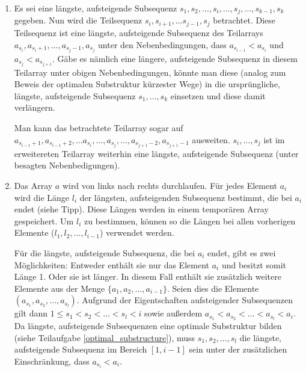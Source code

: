\documentclass[11pt,a4paper]{article}
\begin{document}
\begin{loesung}
    \begin{enumerate}
        \item Es sei eine längste, aufsteigende Subsequenz $s_1, s_2, \ldots, s_i, \ldots, s_j, \ldots, s_{k - 1}, s_k$ gegeben.
        Nun wird die Teilsequenz $s_i, s_{i + 1}, \ldots s_{j - 1}, s_j$ betrachtet.
        Diese Teilsequenz ist eine längste, aufsteigende Subsequenz des Teilarrays $a_{s_i}, a_{s_i + 1}, \ldots, a_{s_j - 1}, a_{s_j}$ unter den Nebenbedingungen, dass $a_{s_{i - 1}} < a_{s_i}$ und $a_{s_j} < a_{s_{j + 1}}$.
        Gäbe es nämlich eine längere, aufsteigende Subsequenz in diesem Teilarray unter obigen Nebenbedingungen, könnte man diese (analog zum Beweis der optimalen Substruktur kürzester Wege) in die ursprüngliche, längste, aufsteigende Subsequenz $s_1, \ldots, s_k$ einsetzen und diese damit verlängern.

        Man kann das betrachtete Teilarray sogar auf $a_{s_{i - 1} + 1}, a_{s_{i - 1} + 2}, \ldots a_{s_i}, \ldots, a_{s_j}, \ldots, a_{s_{j + 1} - 2}, a_{s_{j + 1} - 1}$ ausweiten.
        $s_i, \ldots, s_j$ ist im erweitereten Teilarray weiterhin eine längste, aufsteigende Subsequenz (unter besagten Nebenbedigungen).

        \item 
        Das Array $a$ wird von links nach rechts durchlaufen. Für jedes Element $a_i$ wird die Länge $l_i$ der längsten, aufsteigenden Subsequenz bestimmt, die bei $a_i$ endet (siehe Tipp).
        Diese Längen werden in einem temporären Array gespeichert.
        Um $l_i$ zu bestimmen, können so die Längen bei allen vorherigen Elemente ($l_1, l_2, \ldots, l_{i-1}$) verwendet werden.
        
        Für die längste, aufsteigende Subsequenz, die bei $a_i$ endet, gibt es zwei Möglichkeiten:
        Entweder enthält sie nur das Element $a_i$ und besitzt somit Länge 1.
        Oder sie ist länger.
        In diesem Fall enthält sie zusätzlich weitere Elemente aus der Menge $\{a_1, a_2, \ldots, a_{i - 1}\}$.
        Seien dies die Elemente $(a_{s_1}, a_{s_2}, \ldots, a_{s_l})$.
        Aufgrund der Eigentschaften aufsteigender Subsequenzen gilt dann $1 \leq s_1 < s_2 < \ldots < s_l < i$ sowie außerdem $a_{s_1} < a_{s_2} < \ldots < a_{s_l} < a_i$.
        Da längste, aufsteigende Subsequenzen eine optimale Substruktur bilden (siehe Teilaufgabe \ref*{optimal_substructure}), muss $s_1, s_2, \ldots, s_l$ die längste, aufsteigende Subsequenz im Bereich $[1, i - 1]$ sein unter der zusätzlichen Einschränkung, dass $a_{s_l} < a_i$.


\end{enumerate}
\end{loesung}
\end{document}
